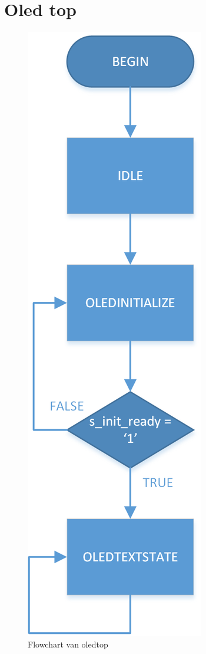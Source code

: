 \newpage
\section{Oled top}
\label{sec:appOledTop}
	\begin{figure}[H]
		\centering
		\includegraphics[height=0.85\textheight]{Appendix/FlowCharts/oled_top}
		\caption{Flowchart van oled\textunderscore top}
		\label{fig:FlowChartOledTop}
	\end{figure}

